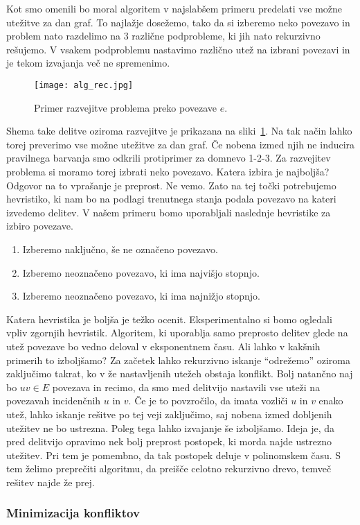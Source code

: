 \documentclass[12pt,a4paper,twoside]{article}
\theoremstyle{definition} %
\theoremstyle{plain} %
\numberwithin{equation}{section}  %
\begin{document}
Kot smo omenili bo moral algoritem v najslabšem primeru predelati vse možne utežitve za dan graf. To najlažje dosežemo, tako da si izberemo neko povezavo in problem nato razdelimo na $3$ različne podprobleme, ki jih nato rekurzivno rešujemo. V vsakem podproblemu nastavimo različno utež na izbrani povezavi in je tekom izvajanja več ne spremenimo.
 \begin{figure}[h!]
\caption{Primer razvejitve problema preko povezave $e$.}
\label{alg_rec}
\centering
    \texttt{[image: alg\_rec.jpg]}
    \end{figure}
Shema take delitve oziroma razvejitve je prikazana na sliki~\ref{alg_rec}. Na tak način lahko torej preverimo vse možne utežitve za dan graf. Če nobena izmed njih ne inducira pravilnega barvanja smo odkrili protiprimer za domnevo 1-2-3. Za razvejitev problema si moramo torej izbrati neko povezavo. Katera izbira je najboljša? Odgovor na to vprašanje je preprost. Ne vemo. Zato na tej točki potrebujemo hevristiko, ki nam bo na podlagi trenutnega stanja podala povezavo na kateri izvedemo delitev. V našem primeru bomo uporabljali naslednje hevristike za izbiro povezave.
\begin{enumerate}
\item Izberemo naključno, še ne označeno povezavo.
\item Izberemo neoznačeno povezavo, ki ima najvišjo stopnjo.
\item Izberemo neoznačeno povezavo, ki ima najnižjo stopnjo.
\end{enumerate}
Katera hevristika je boljša je težko ocenit. Eksperimentalno si bomo ogledali vpliv zgornjih hevristik. Algoritem, ki uporablja samo preprosto delitev glede na utež povezave bo vedno deloval v eksponentnem času. Ali lahko v kakšnih primerih to izboljšamo? Za začetek lahko rekurzivno iskanje ``odrežemo'' oziroma zaključimo takrat, ko v že nastavljenih utežeh obstaja konflikt. Bolj natančno naj bo $uv \in E$ povezava in recimo, da smo med delitvijo nastavili vse uteži na povezavah incidenčnih $u$ in $v$. Če je to povzročilo, da imata vozliči $u$ in $v$ enako utež, lahko iskanje rešitve po tej veji zaključimo, saj nobena izmed dobljenih utežitev ne bo ustrezna. Poleg tega lahko izvajanje še izboljšamo. Ideja je, da pred delitvijo opravimo nek bolj preprost postopek, ki morda najde ustrezno utežitev. Pri tem je pomembno, da tak postopek deluje v polinomskem času. S tem želimo preprečiti algoritmu, da preišče celotno rekurzivno drevo, temveč rešitev najde že prej.

\subsubsection{Minimizacija konfliktov}
\end{document}
